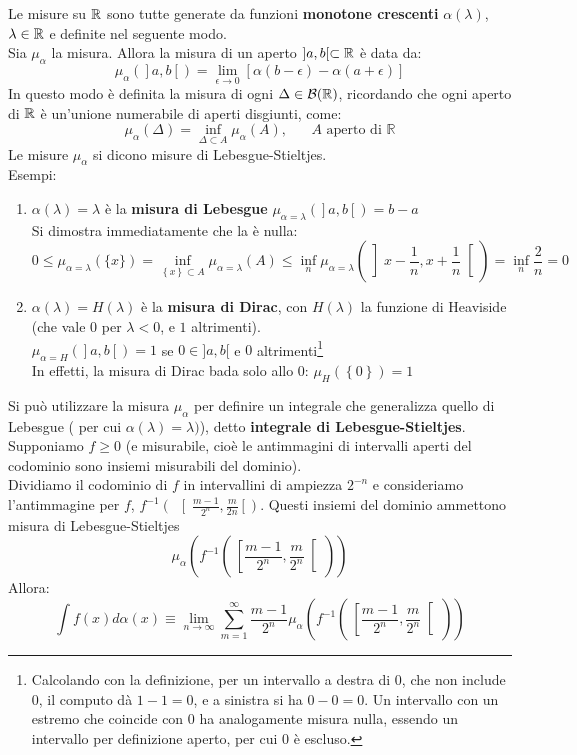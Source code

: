 \documentclass[FisicaTeorica.tex]{subfiles}
\begin{document}
Le misure  su $\mathbb{R}$ sono tutte generate da funzioni \textbf{monotone crescenti} $\alpha\left(\lambda\right)$, $\lambda \in \mathbb{R}$ e definite nel seguente modo.\\
Sia $\mu_\alpha$ la misura. Allora la misura di un aperto $]a,b[ \subset \mathbb{R}$ è data da:
\[ \mu_\alpha\left(\right]a,b\left[\right)=\lim_{\epsilon\rightarrow0} \left[ \alpha \left(b-\epsilon\right) - \alpha \left(a+\epsilon\right) \right] \]
In questo modo è definita la misura di ogni $\Delta \in \mathcal{B}(\mathbb{R})$, ricordando che ogni aperto di $\mathbb{R}$ è un'unione numerabile di aperti disgiunti, come:
\[
\mu_\alpha\left(\Delta\right)=\inf_{\Delta\subset A}{\mu_\alpha(A), \quad \text{\ $A$\ aperto\ di }\mathbb{R}}
\]
Le misure $\mu_\alpha$ si dicono misure di Lebesgue-Stieltjes.\\
Esempi:
\begin{enumerate}
    \item $\alpha \left(\lambda\right)=\lambda$ è la \textbf{misura di Lebesgue}
	$\mu_{\alpha=\lambda}\left(\right]a,b\left[\right)=b-a$\\
	Si dimostra immediatamente che la  è nulla:
	\[ 0\leq \mu_{\alpha=\lambda}\left(\{x\}\right)=\inf_{\left\{x\right\}\subset A}{\mu_{\alpha=\lambda}\left(A\right)\le\inf_n{\mu_{\alpha=\lambda}\left(\left]x-\frac{1}{n},x+\frac{1}{n}\right[\right)=\inf_n{\frac{2}{n}=0}}} \]
	\item $\alpha \left(\lambda\right)=H\left(\lambda\right)$ è la \textbf{misura di Dirac}, con $H(\lambda)$ la funzione di Heaviside (che vale $0$ per $\lambda <0$, e $1$ altrimenti).\\
	$\mu_{\alpha=H}\left(\right]a,b\left[\right)=1$ se $0\in]a,b[$ e $0$ altrimenti\footnote{Calcolando con la definizione, per un intervallo a destra di $0$, che non include $0$, il computo dà $1-1 = 0$, e a sinistra si ha $0-0 = 0$. Un intervallo con un estremo che coincide con $0$ ha analogamente misura nulla, essendo un intervallo per definizione aperto, per cui $0$ è escluso.}\\
	In effetti, la misura di Dirac bada solo allo $0$: $\mu_H\left(\left\{0\right\}\right)=1$
\end{enumerate}
Si può utilizzare la misura $\mu_\alpha$ per definire un integrale che generalizza quello di Lebesgue ( per cui $\alpha \left(\lambda\right)= \lambda)$), detto \textbf{integrale di Lebesgue-Stieltjes}.\\
Supponiamo $f\geq 0$ (e misurabile, cioè le antimmagini di intervalli aperti del codominio sono insiemi misurabili del dominio).\\
Dividiamo il codominio di $f$ in intervallini di ampiezza $2^{-n}$ e consideriamo l'antimmagine per $f$, $f^{-1}\left(\ \right[\frac{m-1}{2^n},\frac{m}{2n}\left[\right)$. Questi insiemi del dominio ammettono misura di Lebesgue-Stieltjes 
\[ \mu_\alpha\left(f^{-1}\left(\ \left[\frac{m-1}{2^n},\frac{m}{2^n}\right[\,\right)\right) \]
Allora:
\[ 
\int f\left(x\right)d\alpha \left(x\right)\equiv \lim_{n\rightarrow\infty}\sum_{m=1}^{\infty}{\frac{m-1}{2^n} \mu_\alpha\left (f^{-1}\left(\ \left [\frac{m-1}{2^n},\frac{m}{2^n}\right [\>\right)\right )}\]
\end{document}
